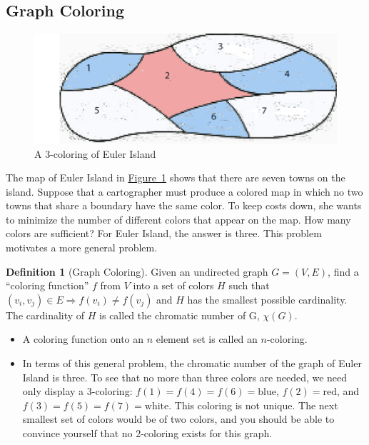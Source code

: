 \documentclass[10pt,]{book}
\theoremstyle{plain}
\theoremstyle{definition}
\newtheorem{definition}[theorem]{Definition}
\theoremstyle{definition}
\theoremstyle{definition}
\theoremstyle{definition}
\theoremstyle{definition}
\numberwithin{equation}{section}
\begin{document}
\subsection[Graph Coloring]{Graph Coloring}\label{ss-graph-coloring}
\leavevmode%
\begin{figure}
\centering
\includegraphics[width=1\linewidth]{images/fig-euler-island.png}
\caption{A 3-coloring of Euler Island
                \label{fig-euler-island}}
\end{figure}
The map of Euler Island in \hyperref[fig-euler-island]{Figure~\ref{fig-euler-island}} shows that there are seven towns on the island. Suppose that a cartographer must produce a colored map in
which no two towns that share a boundary have the same color. To keep costs down, she wants to minimize the number of different colors that appear
on the map. How many colors are sufficient? For Euler Island, the answer is three. This problem motivates a more general problem.%
\begin{definition}[Graph Coloring]\label{def-graph-coloring}
\label{notation-7}
Given an undirected graph \(G = (V, E)\), find a ``coloring function'' \(f\) from \(V\) into a
set of colors \(H\) such that \(\left(v_i,v_j\right)\in E \Rightarrow  f\left(v_i\right)\neq f\left(v_j\right)\) and \(H\) has the smallest
possible cardinality. The cardinality of \(H\) is called the  chromatic number of G, \(\chi(G)\).%
\end{definition}
\par
\leavevmode%
\begin{itemize}[label=\textbullet]
\item{} A coloring function onto an \(n\) element set is called an \(n\)-coloring.%
\item{} In terms of this general problem, the chromatic number of the graph of Euler Island is three. To see that no more than three colors are needed,
we need only display a 3-coloring: \(f(1) = f(4) = f(6) = \text{blue}\), \(f(2) = \text{red}\), and \(f(3) = f(5) = f(7) = \text{white}\). This coloring
is not unique. The next smallest set of colors would be of two colors, and you should be able to convince yourself that no 2-coloring exists for
this graph.
%
\end{itemize}
\end{document}
